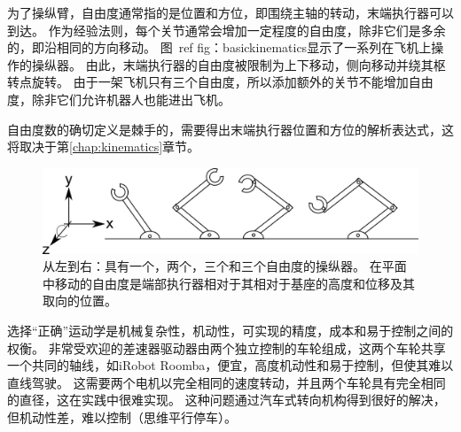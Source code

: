 
为了操纵臂，自由度通常指的是位置和方位，即围绕主轴的转动，末端执行器可以到达。 作为经验法则，每个关节通常会增加一定程度的自由度，除非它们是多余的，即沿相同的方向移动。 图\ ref {fig：basickinematics}显示了一系列在飞机上操作的操纵器。 由此，末端执行器的自由度被限制为上下移动，侧向移动并绕其枢转点旋转。 由于一架飞机只有三个自由度，所以添加额外的关节不能增加自由度，除非它们允许机器人也能进出飞机。

自由度数的确切定义是棘手的，需要得出末端执行器位置和方位的解析表达式，这将取决于第\ref{chap:kinematics}章节。

\begin{figure}
	\centering
		\includegraphics[width=\textwidth]{figs/basickinematics.png}
	\caption{从左到右：具有一个，两个，三个和三个自由度的操纵器。 在平面中移动的自由度是端部执行器相对于其相对于基座的高度和位移及其取向的位置。}
	\label{fig:basickinematics}
\end{figure}


选择“正确”运动学是机械复杂性，机动性，可实现的精度，成本和易于控制之间的权衡。 非常受欢迎的差速器驱动器由两个独立控制的车轮组成，这两个车轮共享一个共同的轴线，如iRobot Roomba，便宜，高度机动性和易于控制，但使其难以直线驾驶。 这需要两个电机以完全相同的速度转动，并且两个车轮具有完全相同的直径，这在实践中很难实现。 这种问题通过汽车式转向机构得到很好的解决，但机动性差，难以控制（思维平行停车）。

